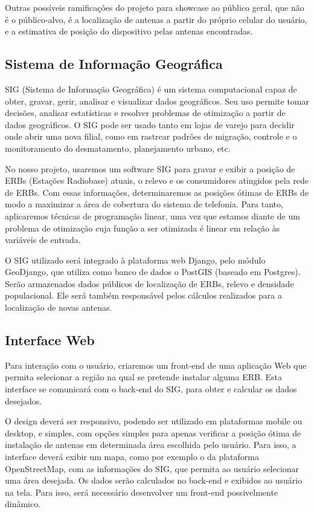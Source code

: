 \documentclass[12pt,a4paper]{article}
\begin{document}
Outras possíveis ramificações do projeto para showcase ao público geral, que não
é o público-alvo, é a localização de antenas a partir do próprio celular do
usuário, e a estimativa de posição do dispositivo pelas antenas encontradas.

\subsection{Sistema de Informação Geográfica}
SIG (Sistema de Informação Geográfica) é um sistema computacional capaz de
obter, gravar, gerir, analisar e visualizar dados geográficos. Seu uso permite
tomar decisões, analisar estatísticas e resolver problemas de otimização a
partir de dados geográficos. O SIG pode ser usado tanto em lojas de varejo para
decidir onde abrir uma nova filial, como em rastrear padrões de migração,
controle e o monitoramento do desmatamento, planejamento urbano, etc.

No nosso projeto, usaremos um software SIG para gravar e exibir a posição de
ERBs (Estações Radiobase) atuais, o relevo e os consumidores atingidos pela
rede de ERBs. Com essas informações, determinaremos as posições ótimas de
ERBs de modo a maximizar a área de cobertura do sistema de telefonia.
Para tanto, aplicaremos técnicas de programação linear, uma vez que
estamos diante de um problema de otimização cuja função a ser otimizada
é linear em relação às variáveis de entrada.

O SIG utilizado será integrado à plataforma web Django, pelo módulo GeoDjango,
que utiliza como banco de dados o PostGIS (baseado em Postgres). Serão armazenados
dados públicos de localização de ERBs, relevo e densidade populacional. Ele
será também responsável pelos cálculos realizados para a localização de novas
antenas.

\subsection{Interface Web}
Para interação com o usuário, criaremos um front-end de uma aplicação Web que
permita selecionar a região na qual se pretende instalar alguma ERB.
Esta interface se comunicará com o back-end do SIG, para obter e calcular os
dados desejados.

O design deverá ser responsivo, podendo ser utilizado em plataformas mobile
ou desktop, e simples, com opções simples para apenas verificar a posição ótima
de instalação de antenas em determinada área escolhida pelo usuário. Para isso,
a interface deverá exibir um mapa, como por exemplo o da plataforma
OpenStreetMap, com as informações do SIG, que permita ao usuário selecionar uma
área desejada. Os dados serão calculados no back-end e exibidos ao usuário na
tela. Para isso, será necessário desenvolver um front-end possivelmente
dinâmico.
\end{document}
